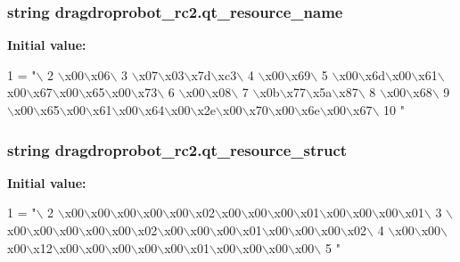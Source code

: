 \subsubsection[{qt\+\_\+resource\+\_\+name}]{\setlength{\rightskip}{0pt plus 5cm}string dragdroprobot\+\_\+rc2.\+qt\+\_\+resource\+\_\+name}\label{namespacedragdroprobot__rc2_a05aa00f77b3db47bd36f81c8022e2c03}
{\bfseries Initial value\+:}
\begin{DoxyCode}
1 = \textcolor{stringliteral}{"\(\backslash\)}
2 \textcolor{stringliteral}{\(\backslash\)x00\(\backslash\)x06\(\backslash\)}
3 \textcolor{stringliteral}{\(\backslash\)x07\(\backslash\)x03\(\backslash\)x7d\(\backslash\)xc3\(\backslash\)}
4 \textcolor{stringliteral}{\(\backslash\)x00\(\backslash\)x69\(\backslash\)}
5 \textcolor{stringliteral}{\(\backslash\)x00\(\backslash\)x6d\(\backslash\)x00\(\backslash\)x61\(\backslash\)x00\(\backslash\)x67\(\backslash\)x00\(\backslash\)x65\(\backslash\)x00\(\backslash\)x73\(\backslash\)}
6 \textcolor{stringliteral}{\(\backslash\)x00\(\backslash\)x08\(\backslash\)}
7 \textcolor{stringliteral}{\(\backslash\)x0b\(\backslash\)x77\(\backslash\)x5a\(\backslash\)x87\(\backslash\)}
8 \textcolor{stringliteral}{\(\backslash\)x00\(\backslash\)x68\(\backslash\)}
9 \textcolor{stringliteral}{\(\backslash\)x00\(\backslash\)x65\(\backslash\)x00\(\backslash\)x61\(\backslash\)x00\(\backslash\)x64\(\backslash\)x00\(\backslash\)x2e\(\backslash\)x00\(\backslash\)x70\(\backslash\)x00\(\backslash\)x6e\(\backslash\)x00\(\backslash\)x67\(\backslash\)}
10 \textcolor{stringliteral}{"}
\end{DoxyCode}
\hypertarget{namespacedragdroprobot__rc2_a4b1b15398713e0cf8239034f27e5da6a}{}
\subsubsection[{qt\+\_\+resource\+\_\+struct}]{\setlength{\rightskip}{0pt plus 5cm}string dragdroprobot\+\_\+rc2.\+qt\+\_\+resource\+\_\+struct}\label{namespacedragdroprobot__rc2_a4b1b15398713e0cf8239034f27e5da6a}
{\bfseries Initial value\+:}
\begin{DoxyCode}
1 = \textcolor{stringliteral}{"\(\backslash\)}
2 \textcolor{stringliteral}{\(\backslash\)x00\(\backslash\)x00\(\backslash\)x00\(\backslash\)x00\(\backslash\)x00\(\backslash\)x02\(\backslash\)x00\(\backslash\)x00\(\backslash\)x00\(\backslash\)x01\(\backslash\)x00\(\backslash\)x00\(\backslash\)x00\(\backslash\)x01\(\backslash\)}
3 \textcolor{stringliteral}{\(\backslash\)x00\(\backslash\)x00\(\backslash\)x00\(\backslash\)x00\(\backslash\)x00\(\backslash\)x02\(\backslash\)x00\(\backslash\)x00\(\backslash\)x00\(\backslash\)x01\(\backslash\)x00\(\backslash\)x00\(\backslash\)x00\(\backslash\)x02\(\backslash\)}
4 \textcolor{stringliteral}{\(\backslash\)x00\(\backslash\)x00\(\backslash\)x00\(\backslash\)x12\(\backslash\)x00\(\backslash\)x00\(\backslash\)x00\(\backslash\)x00\(\backslash\)x00\(\backslash\)x01\(\backslash\)x00\(\backslash\)x00\(\backslash\)x00\(\backslash\)x00\(\backslash\)}
5 \textcolor{stringliteral}{"}
\end{DoxyCode}
